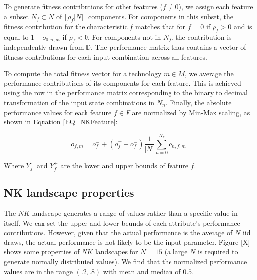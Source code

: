 \documentclass[12pt]{article}
\begin{document}
	To generate fitness contributions for other features ($f \neq 0$), we assign each feature a subset $N_{f} \subset N$ of $\lfloor \rho_{f} |N| \rfloor$ components. For components in this subset, the fitness contribution for the characteristic $f$ matches that for $f=0$ if $\rho_{f} > 0$ and is equal to $1 -o_{0,n,m}$ if $\rho_{f} < 0$. For components not in $N_{f}$, the contribution is independently drawn from $\mathbb{D}$. The performance matrix thus contains a vector of fitness contributions for each input combination across all features.
	
	To compute the total fitness vector for a technology $m \in M$, we average the performance contributions of its components for each feature. This is achieved using the row in the performance matrix corresponding to the binary to decimal transformation of the input state combinations in $N_{n}$. Finally, the absolute performance values for each feature $f \in F$ are normalized by Min-Max scaling, as shown in Equation \ref{EQ_NKFeature}:
	
	\begin{equation} 
		o_{f,m} =o^-_{f} + \left(o^+_{f} -o^-_{f}\right) \frac{1}{|N|} \sum_{n=0}^{N_z}o_{n,f,m}
		\label{EQ_NKFeature} 
	\end{equation}
	
	Where $Y^-_{f}$ and $Y^+_{f}$ are the lower and upper bounds of feature $f$.
	
	\subsection{NK landscape properties} \label{Appendix_NKProperties}
	The $NK$ landscape generates a range of values rather than a specific value in itself. We can set the upper and lower bounds of each attribute's performance contributions. However, given that the actual performance is the average of $N$ iid draws, the actual performance is not likely to be the input parameter. Figure [X] shows some properties of $NK$ landscapes for $N=15$ (a large $N$ is required to generate normally distributed values). We find that the normalized performance values are in the range $(.2,.8)$ with mean and median of $0.5$.\\
	
\end{document}

